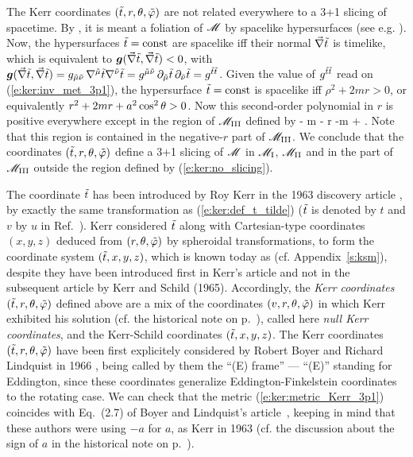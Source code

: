 \begin{remark} \label{r:ker:Kerr_slicing}
The Kerr coordinates
$({\tilde t},r,\theta,{\tilde\varphi})$ are not related everywhere to a 3+1 slicing of
spacetime. By , it is meant a foliation of $\mathscr{M}$
by spacelike hypersurfaces (see e.g. \cite{Gourg12}). Now, the hypersurfaces
${\tilde t} = \mathrm{const}$ are spacelike iff their normal $\vec{\nabla} {\tilde t}$ is timelike, which
is equivalent to $\bm{g}(\vec{\nabla} {\tilde t}, \vec{\nabla} {\tilde t}) < 0$, with
$\bm{g}(\vec{\nabla} {\tilde t}, \vec{\nabla} {\tilde t}) = g_{\tilde{\mu}\tilde{\nu}} \, \nabla^{\tilde{\mu}} {\tilde t} \nabla^{\tilde{\nu}} {\tilde t}
    = g^{\tilde{\mu}\tilde{\nu}}\,  \partial_{\tilde{\mu}} {\tilde t} \, \partial_{\tilde{\nu}} {\tilde t} = g^{{\tilde t}{\tilde t}}$.
Given the value of $g^{{\tilde t}{\tilde t}}$ read on (\ref{e:ker:inv_met_3p1}), the hypersurface
${\tilde t}=\mathrm{const}$ is spacelike iff $\rho^2+2mr > 0$, or equivalently
$r^2 + 2 mr + a^2\cos^2\theta > 0$. Now this second-order polynomial in $r$
is positive everywhere except in the region of $\mathscr{M}_{\rm III}$ defined by
\be \label{e:ker:no_slicing}
    - m -  \leq r \leq -m +  .
\ee
Note that this region is contained in the negative-$r$ part of $\mathscr{M}_{\rm III}$.
We conclude that the coordinates $({\tilde t},r,\theta,{\tilde\varphi})$ define a 3+1 slicing of $\mathscr{M}$
in $\mathscr{M}_{\rm I}$, $\mathscr{M}_{\rm II}$ and in the part of $\mathscr{M}_{\rm III}$ outside the
region defined by (\ref{e:ker:no_slicing}).
\end{remark}

\begin{hist}
The coordinate ${\tilde t}$ has been introduced by Roy Kerr
in the 1963 discovery article \cite{Kerr63}, by exactly
the same transformation as (\ref{e:ker:def_t_tilde}) (${\tilde t}$ is denoted by $t$
and $v$ by $u$ in Ref.~\cite{Kerr63}).
Kerr considered ${\tilde t}$ along with Cartesian-type coordinates $(x,y,z)$
deduced from $(r,\theta,{\tilde\varphi})$ by spheroidal transformations, to form the
coordinate system $({\tilde t},x,y,z)$, which is known today as
 (cf. Appendix~\ref{s:ksm}),
despite
they have been introduced first in Kerr's article \cite{Kerr63} and not
in the subsequent article by Kerr and Schild \cite{KerrS65} (1965). Accordingly,
the \emph{Kerr coordinates} $({\tilde t}, r, \theta,{\tilde\varphi})$ defined above
are a mix of the coordinates
$(v,r,\theta,{\tilde\varphi})$ in which Kerr exhibited his solution
(cf. the historical note on p.~\pageref{h:ker:Kerr_coord}), called here
\emph{null Kerr coordinates},
and the Kerr-Schild coordinates $({\tilde t},x,y,z)$.
The Kerr coordinates $({\tilde t}, r, \theta,{\tilde\varphi})$ have been first explicitely
considered by Robert Boyer and Richard Lindquist
in 1966 \cite{BoyerL67}, being called by them the ``(E) frame'' --- ``(E)'' standing
for Eddington, since these coordinates generalize
Eddington-Finkelstein coordinates to the rotating case.
We can check that the metric (\ref{e:ker:metric_Kerr_3p1}) coincides
with Eq.~(2.7) of Boyer and Lindquist's article~\cite{BoyerL67},
keeping in mind that these authors were using $-a$ for $a$, as Kerr in 1963
(cf. the discussion about the sign of $a$ in
the historical note on p.~\pageref{h:ker:Kerr_coord}).
\end{hist}




